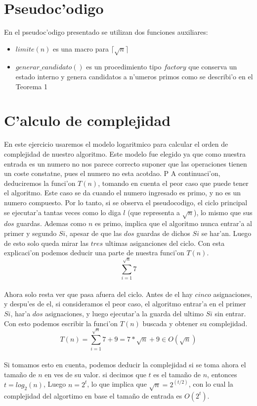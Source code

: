 \section{Pseudoc'odigo}


En el pseudoc'odigo presentado se utilizan dos funciones auxiliares:
\begin{itemize}
\item $limite(n)$ es una macro para $\lceil\sqrt{n}\rceil$
\item $generar\_candidato()$ es un procedimiento tipo $factory$ que conserva un estado interno 
y genera candidatos a n'umeros primos como se describi'o en el Teorema 1
\end{itemize}

\section{C'alculo de complejidad}
En este ejercicio usaremos el modelo logaritmico para calcular el orden de complejidad de nuestro algoritmo. Este modelo fue elegido ya que como nuestra entrada es un numero no nos parece correcto suponer que las operaciones tienen un coste constatne, pues el numero no esta acotdao. P
A continuaci'on, deduciremos la funci'on $T(n)$, tomando en cuenta el peor caso que puede tener el algoritmo. Este caso se da cuando el numero ingresado es primo, y no es un numero compuesto. Por lo tanto, si se observa el pseudocodigo, el ciclo principal se ejecutar'a tantas veces como lo diga $l$ (que representa a $\sqrt{n}$), lo mismo que sus $dos$ guardas. Ademas como $n$ es primo, implica que el algoritmo nunca entrar'a al primer y segundo $Si$, apesar de que las $dos$ guardas de dichos $Si$ se har'an. Luego de esto solo queda mirar las $tres$ ultimas asiganciones del ciclo. Con esta explicaci'on podemos deducir una parte de nuestra funci'on $T(n)$.
$$\sum_{i=1}^{\sqrt{n}}7$$\\
Ahora solo resta ver que pasa afuera del ciclo. Antes de el hay $cinco$ asignaciones, y despu'es de el, si consideramos el peor caso, el algoritmo entrar'a en el primer $Si$, har'a $dos$ asignaciones, y luego ejecutar'a la guarda del ultimo $Si$ sin entrar. Con esto podemos escribir la funci'on $T(n)$ buscada y obtener su complejidad.\\
$$T(n) = \sum_{i=1}^{\sqrt{n}}7 + 9 = 7*\sqrt{n} + 9 \in O(\sqrt{n})$$\\
Si tomamos esto en cuenta, podemos deducir la complejidad si se toma ahora el tama\~{n}o de $n$ en ves de su valor. si decimos que $t$ es el tama\~{n}o de $n$, entonces $t = log_2(n)$, Luego $n = 2^t$, lo que implica que $\sqrt{n} = 2^{(t/2)}$, con lo cual la complejidad del algortimo en base el tama\~{n}o de entrada es $O(2^t)$.

